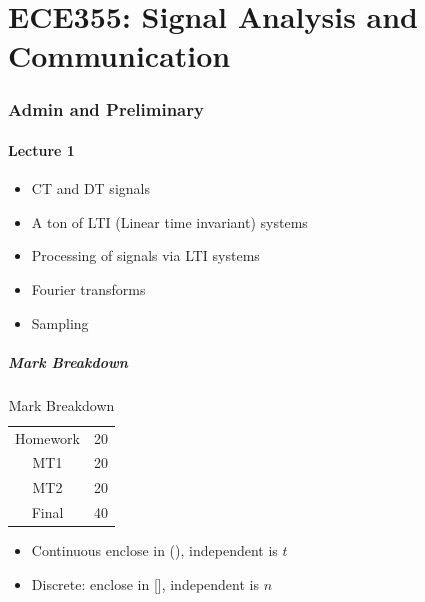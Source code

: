 \documentclass[../notes.tex]{subfiles}
\begin{document}
\part{ECE355: Signal Analysis and Communication}

\section{Admin and Preliminary}
\subsection{Lecture 1}
\begin{itemize}
	\item  CT and DT signals
	\item A ton of LTI (Linear time invariant) systems
	\item Processing of signals via LTI systems
	\item Fourier transforms
	\item Sampling
\end{itemize}
\subsubsection{Mark Breakdown}

\begin{table}[H]
	\centering
	\caption{Mark Breakdown}
	\begin{tabular}{|c|c|}
		\hline
		Homework & 20 \\
		MT1 & 20 \\
		MT2 & 20 \\
		Final & 40 \\
		\hline
	\end{tabular}
\end{table}


\begin{itemize}
	\item Continuous enclose in (), independent is $ t $ 
	\item Discrete: enclose in [], independent is $ n $ 
\end{itemize}


\end{document}
